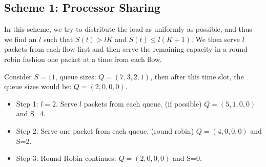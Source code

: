 \documentclass[11pt, a4paper]{article}
\begin{document}
\subsection{Scheme 1: Processor Sharing}
In this scheme, we try to distribute the load as uniformly as possible, and thus we find an $l$ such that $S(t) > lK$ and $S(t) \le l(K+1)$. We then serve $l$ packets from each flow first and then serve the remaining capacity in a round robin fashion one packet at a time from each flow. 

Consider $S=11$, queue sizes: $Q = (7,3,2,1)$, then after this time slot, the queue sizes would be: $Q = (2,0,0,0)$.

\begin{itemize} 
\item Step 1: $l=2$. Serve $l$ packets from each queue. (if possible) $Q = (5,1,0,0)$ and S=4.
\item Step 2: Serve one packet from each queue. (round robin) $Q = (4,0,0,0)$ and S=2.
\item Step 3: Round Robin continues: $Q = (2,0,0,0)$ and S=0.
\end{itemize}
\end{document}
